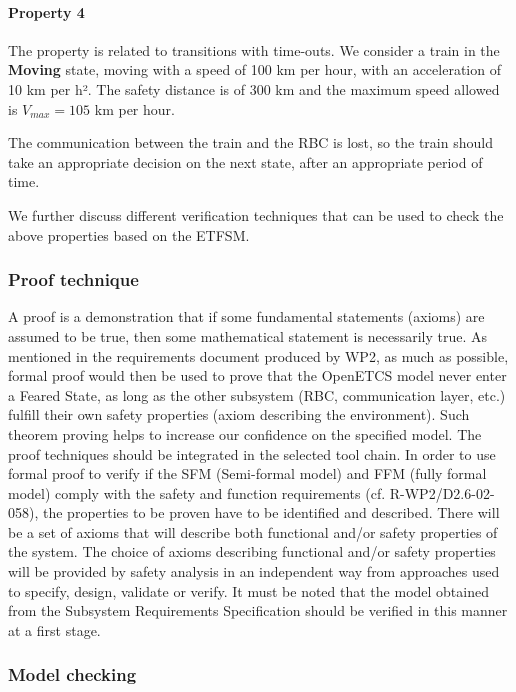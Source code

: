 \documentclass{template/openetcs_article}
\begin{document}
\paragraph*{Property 4}

The property is related to transitions with time-outs. We consider a train in the \textbf{Moving} state, moving with a speed of 100 km per hour, with an acceleration of 10 km per h². The safety distance is of 300 km and the maximum speed allowed is $V_{max} = 105$ km per hour. 

The communication between the train and the RBC is lost, so the train should take an appropriate decision on the next state, after an appropriate period of time.
 
We further discuss different verification techniques that can be used to check the above properties based on the ETFSM.

\subsubsection{Proof technique}

A proof is a demonstration that if some fundamental statements (axioms) are assumed to be true, then some mathematical statement is necessarily true. As mentioned in the requirements document produced by WP2, as much as possible, formal proof would then be used to prove that the OpenETCS model never enter a Feared State, as long as the other subsystem (RBC, communication layer, etc.) fulfill their own safety properties (axiom describing the environment). Such theorem proving helps to increase our confidence on the specified model.  The proof techniques should be integrated in the selected tool chain. In order to use formal proof to verify if the SFM (Semi-formal model) and FFM (fully formal model) comply with the safety and function requirements (cf. R-WP2/D2.6-02-058), the properties to be proven have to be identified and described. There will be a set of axioms that will describe both functional and/or safety properties of the system. The choice of axioms describing functional and/or safety properties will be provided by safety analysis in an independent way from approaches used to specify, design, validate or verify. It must be noted that the model obtained from the Subsystem Requirements Specification should be verified in this manner at a first stage.

\subsubsection{Model checking}
\end{document}

